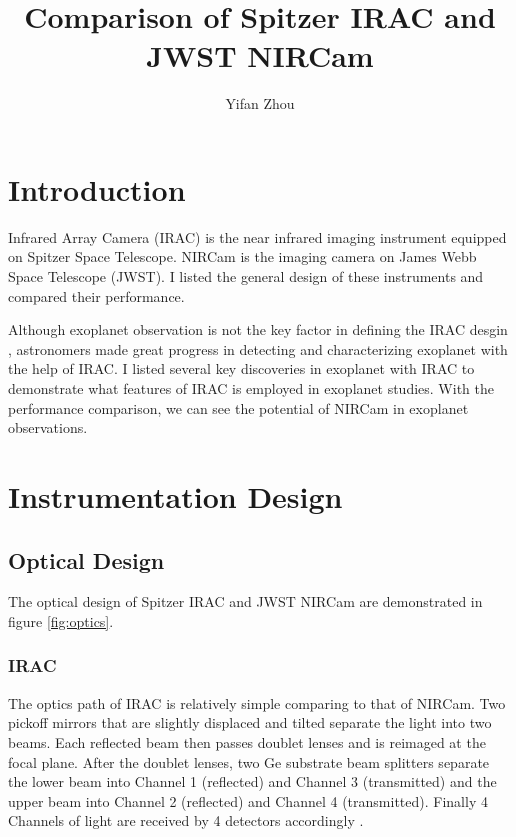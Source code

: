 \documentclass[preprint, 12pt]{aastex} \synctex=1
\begin{document}
  \title{Comparison of
Spitzer IRAC and JWST NIRCam} \author{Yifan Zhou}  

\section{Introduction} Infrared Array Camera (IRAC) is the near
infrared imaging instrument equipped on Spitzer Space
Telescope. NIRCam is the imaging camera on James Webb Space Telescope
(JWST). I listed the general design of these instruments and compared
their performance.

Although exoplanet observation is not the key factor in defining the
IRAC desgin \citep{2004ApJS..154...10F}, astronomers made great
progress in detecting and characterizing exoplanet with the help of
IRAC. I listed several key discoveries in exoplanet with IRAC to
demonstrate what features of IRAC is employed in exoplanet
studies. With the performance comparison, we can see the potential of
NIRCam in exoplanet observations.

\section{Instrumentation Design}
\subsection{Optical Design}

The optical design of Spitzer IRAC and JWST NIRCam are demonstrated in
figure \ref{fig:optics}.\par

\subsubsection{IRAC} The optics path of IRAC is relatively simple
comparing to that of NIRCam. Two pickoff mirrors that are slightly
displaced and tilted separate the light into two beams. Each reflected
beam then passes doublet lenses and is reimaged at the focal
plane. After the doublet lenses, two Ge substrate beam splitters
separate the lower beam into Channel 1 (reflected) and Channel 3
(transmitted) and the upper beam into Channel 2 (reflected) and
Channel 4 (transmitted). Finally 4 Channels of light are received by 4
detectors accordingly \citep{2004ApJS..154...10F}.\par
\end{document}
